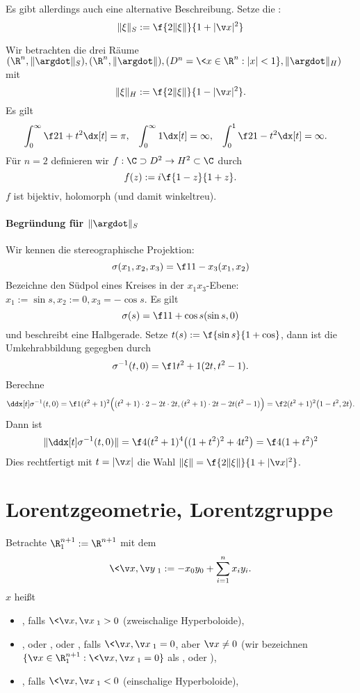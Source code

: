 Es gibt allerdings auch eine alternative Beschreibung.
Setze die :
\[
	\|\xi\|_S := \f {2\|\xi\|}{1 + |\v x|^2}
\]

Wir betrachten die drei Räume $(\R^n, \|\argdot\|_S), (\R^n, \|\argdot\|), (D^n = \<x \in \R^n : |x| < 1 \}, \|\argdot\|_H)$
mit
\[
	\|\xi\|_H := \f {2\|\xi\|}{1 - |\v x|^2}.
\]
Es gilt
\begin{align*}
	\int_0^\infty \f 2{1+t^2} \dx[t] &= \pi, &
	\int_0^\infty 1 \dx[t] &= \infty, &
	\int_0^1 \f 2{1-t^2} \dx[t] &= \infty.
\end{align*}
Für $n=2$ definieren wir $f: \C \supset D^2 \to H^2 \subset \C$ durch
\[
	f(z) := i \f {1-z}{1+z}.
\]
$f$ ist bijektiv, holomorph (und damit winkeltreu).

\paragraph{Begründung für $\|\argdot\|_S$}

Wir kennen die stereographische Projektion:
\[
	\sigma(x_1, x_2, x_3) = \f 1{1-x_3} (x_1, x_2)
\]
Bezeichne den Südpol eines Kreises in der $x_1x_3$-Ebene: $x_1 := \sin s, x_2 := 0, x_3 = -\cos s$.
Es gilt
\[
	\sigma(s) = \f 1{1 + \cos s} (\sin s, 0)
\]
und beschreibt eine Halbgerade.
Setze $t(s) := \f {\sin s}{1 + \cos}$, dann ist die Umkehrabbildung gegegben durch
\[
	\sigma^{-1}(t, 0)
	= \f 1{t^2 + 1} (2t, t^2 - 1).
\]
Berechne
\[
	\ddx[t] \sigma^{-1}(t, 0)
	= \f 1{(t^2 + 1)^2} \Big( (t^2 + 1) \cdot 2 - 2t \cdot 2t, (t^2 + 1)\cdot 2t - 2t (t^2 - 1) \Big) \\
	= \f 2{(t^2 + 1)^2} \big( 1 - t^2, 2t \big).
\]
Dann ist
\[
	\| \ddx[t] \sigma^{-1} (t, 0) \|
	= \f 4{(t^2 + 1)^4} \big( (1+t^2)^2 + 4t^2 \big)
	= \f 4{(1+t^2)^2}
\]
Dies rechtfertigt mit $t = |\v x|$ die Wahl $\|\xi\| = \f {2\|\xi\|}{1 + |\v x|^2}$.


\section{Lorentzgeometrie, Lorentzgruppe}

Betrachte $\R_1^{n+1} := \R^{n+1}$ mit dem 
\[
	\< \v x, \v y \>_1 :=
	-x_0 y_0 + \sum_{i=1}^n x_i y_i.
\]
$x$ heißt
\begin{itemize}
	\item
		, falls $\<\v x, \v x\>_1 > 0$ (zweischalige Hyperboloide),
	\item
		, oder , oder , falls $\<\v x, \v x\>_1 = 0$, aber $\v x \neq 0$ (wir bezeichnen $\{ \v x \in \R_1^{n+1} : \<\v x, \v x\>_1 = 0 \}$ als , oder ),
	\item
		, falls $\<\v x, \v x\>_1 < 0$ (einschalige Hyperboloide),
\end{itemize}

